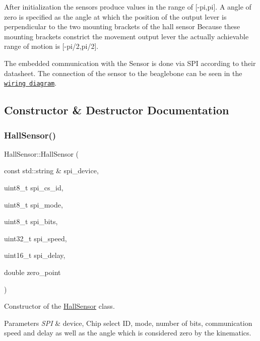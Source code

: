 After initialization the sensors produce values in the range of \mbox{[}-\/pi,pi\mbox{]}. A angle of zero is specified as the angle at which the position of the output lever is perpendicular to the two mounting brackets of the hall sensor Because these mounting brackets constrict the movement output lever the actually achievable range of motion is \mbox{[}-\/pi/2,pi/2\mbox{]}.

The embedded communication with the Sensor is done via S\+PI according to their datasheet. The connection of the sensor to the beaglebone can be seen in the \href{https://triped-robot.github.io/docs/embedded/}{\tt wiring diagram}. 

\subsection{Constructor \& Destructor Documentation}
\mbox{\label{classHallSensor_ac901b856eff0dffb4dfa5fdeaf888c4c}} 
\subsubsection{\texorpdfstring{Hall\+Sensor()}{HallSensor()}}
{\footnotesize\ttfamily Hall\+Sensor\+::\+Hall\+Sensor (\begin{DoxyParamCaption}\item[{const std\+::string \&}]{spi\+\_\+device,  }\item[{uint8\+\_\+t}]{spi\+\_\+cs\+\_\+id,  }\item[{uint8\+\_\+t}]{spi\+\_\+mode,  }\item[{uint8\+\_\+t}]{spi\+\_\+bits,  }\item[{uint32\+\_\+t}]{spi\+\_\+speed,  }\item[{uint16\+\_\+t}]{spi\+\_\+delay,  }\item[{double}]{zero\+\_\+point }\end{DoxyParamCaption})}



Constructor of the \hyperlink{classHallSensor}{Hall\+Sensor} class. 


\begin{DoxyParams}{Parameters}
{\em S\+PI} & device, Chip select ID, mode, number of bits, communication speed and delay as well as the angle which is considered zero by the kinematics. \\
\hline
\end{DoxyParams}


